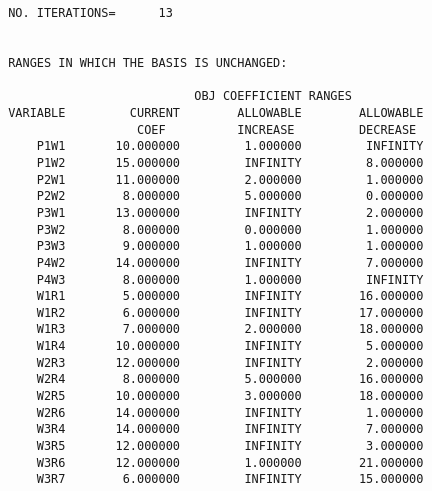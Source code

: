 \documentclass[12pt]{report}
\begin{document}
\begin{verbatim}
 NO. ITERATIONS=      13


 RANGES IN WHICH THE BASIS IS UNCHANGED:

                           OBJ COEFFICIENT RANGES
 VARIABLE         CURRENT        ALLOWABLE        ALLOWABLE
                   COEF          INCREASE         DECREASE
     P1W1       10.000000         1.000000         INFINITY
     P1W2       15.000000         INFINITY         8.000000
     P2W1       11.000000         2.000000         1.000000
     P2W2        8.000000         5.000000         0.000000
     P3W1       13.000000         INFINITY         2.000000
     P3W2        8.000000         0.000000         1.000000
     P3W3        9.000000         1.000000         1.000000
     P4W2       14.000000         INFINITY         7.000000
     P4W3        8.000000         1.000000         INFINITY
     W1R1        5.000000         INFINITY        16.000000
     W1R2        6.000000         INFINITY        17.000000
     W1R3        7.000000         2.000000        18.000000
     W1R4       10.000000         INFINITY         5.000000
     W2R3       12.000000         INFINITY         2.000000
     W2R4        8.000000         5.000000        16.000000
     W2R5       10.000000         3.000000        18.000000
     W2R6       14.000000         INFINITY         1.000000
     W3R4       14.000000         INFINITY         7.000000
     W3R5       12.000000         INFINITY         3.000000
     W3R6       12.000000         1.000000        21.000000
     W3R7        6.000000         INFINITY        15.000000


\end{verbatim}
\end{document}
